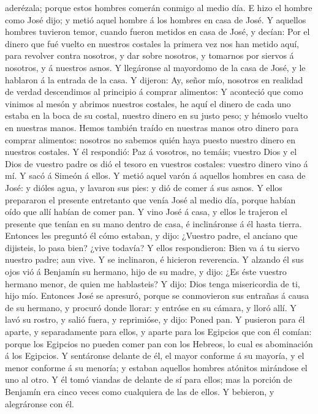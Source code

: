 aderézala; porque estos hombres comerán conmigo al medio día.
 E hizo el hombre como José dijo; y metió aquel hombre á
los hombres en casa de José.  Y aquellos hombres tuvieron
temor, cuando fueron metidos en casa de José, y decían: Por el dinero
que fué vuelto en nuestros costales la primera vez nos han metido aquí,
para revolver contra nosotros, y dar sobre nosotros, y tomarnos por
siervos á nosotros, y á nuestros asnos.  Y llegáronse al
mayordomo de la casa de José, y le hablaron á la entrada de la casa.
 Y dijeron: Ay, señor mío, nosotros en realidad de verdad
descendimos al principio á comprar alimentos:  Y
aconteció que como vinimos al mesón y abrimos nuestros costales, he aquí
el dinero de cada uno estaba en la boca de su costal, nuestro dinero en
su justo peso; y hémoslo vuelto en nuestras manos.  Hemos
también traído en nuestras manos otro dinero para comprar alimentos:
nosotros no sabemos quién haya puesto nuestro dinero en nuestros
costales.  Y él respondió: Paz á vosotros, no temáis;
vuestro Dios y el Dios de vuestro padre os dió el tesoro en vuestros
costales: vuestro dinero vino á mí. Y sacó á Simeón á ellos.
 Y metió aquel varón á aquellos hombres en casa de José:
y dióles agua, y lavaron sus pies: y dió de comer á sus asnos.
 Y ellos prepararon el presente entretanto que venía José
al medio día, porque habían oído que allí habían de comer pan.
 Y vino José á casa, y ellos le trajeron el presente que
tenían en su mano dentro de casa, é inclináronse á él hasta tierra.
 Entonces les preguntó él cómo estaban, y dijo: ¿Vuestro
padre, el anciano que dijisteis, lo pasa bien? ¿vive todavía?
 Y ellos respondieron: Bien va á tu siervo nuestro padre;
aun vive. Y se inclinaron, é hicieron reverencia.  Y
alzando él sus ojos vió á Benjamín su hermano, hijo de su madre, y dijo:
¿Es éste vuestro hermano menor, de quien me hablasteis? Y dijo: Dios
tenga misericordia de ti, hijo mío.  Entonces José se
apresuró, porque se conmovieron sus entrañas á causa de su hermano, y
procuró donde llorar: y entróse en su cámara, y lloró allí.
 Y lavó su rostro, y salió fuera, y reprimióse, y dijo:
Poned pan.  Y pusieron para él aparte, y separadamente
para ellos, y aparte para los Egipcios que con él comían: porque los
Egipcios no pueden comer pan con los Hebreos, lo cual es abominación á
los Egipcios.  Y sentáronse delante de él, el mayor
conforme á su mayoría, y el menor conforme á su menoría; y estaban
aquellos hombres atónitos mirándose el uno al otro.  Y él
tomó viandas de delante de sí para ellos; mas la porción de Benjamín era
cinco veces como cualquiera de las de ellos. Y bebieron, y alegráronse
con él.

